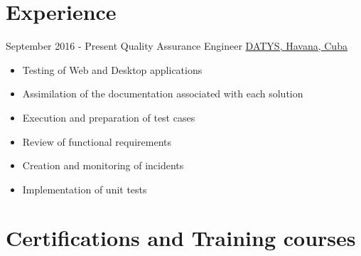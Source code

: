 \documentclass[letterpaper]{twentysecondcv} %
\begin{document}
\makeprofile %
 

\section{Experience}

\begin{twenty} %
\twentyitem
    	{September 2016 -}
		{Present}
        {Quality Assurance Engineer}
        {\href{http://datys.cu/}{DATYS, Havana, Cuba}}
        {}
        {
        {\begin{itemize}
        \item Testing of Web and Desktop applications
        \item Assimilation of the documentation associated with each solution
        \item Execution and preparation of test cases
        \item Review of functional requirements 
        \item Creation and monitoring of incidents
        \item Implementation of unit tests
        \end{itemize}}
        }
        
\end{twenty}

\section{Certifications and Training courses}
\end{document}
